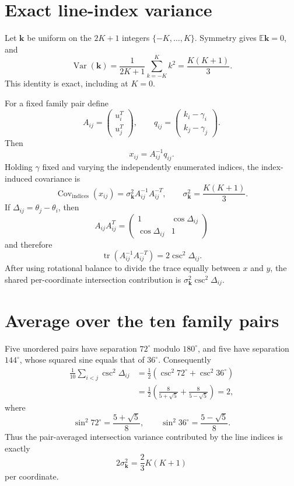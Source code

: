 \documentclass[11pt]{article}
\newcommand{\E}{\mathbb{E}}
\newcommand{\Var}{\operatorname{Var}}
\newcommand{\Cov}{\operatorname{Cov}}
\begin{document}
\section{Exact line-index variance}

Let \(\mathbf{k}\) be uniform on the \(2K+1\) integers
\(\{-K,\ldots,K\}\).  Symmetry gives \(\E\mathbf{k}=0\), and
\[
  \Var(\mathbf{k})
  =\frac{1}{2K+1}
    \sum_{k=-K}^{K}k^2
  =\frac{K(K+1)}{3}.
  \label{eq:index-variance}
\]
This identity is exact, including at \(K=0\).

For a fixed family pair define
\[
  A_{ij}=
  \begin{pmatrix}u_i^T\\u_j^T\end{pmatrix},
  \qquad
  q_{ij}=
  \begin{pmatrix}k_i-\gamma_i\\k_j-\gamma_j\end{pmatrix}.
\]
Then
\[
  x_{ij}=A_{ij}^{-1}q_{ij}.
\]
Holding \(\gamma\) fixed and varying the independently enumerated indices,
the index-induced covariance is
\[
  \Cov_{\mathrm{indices}}(x_{ij})
  =\sigma_{\mathbf{k}}^2 A_{ij}^{-1}A_{ij}^{-T},
  \qquad
  \sigma_{\mathbf{k}}^2=\frac{K(K+1)}{3}.
\]
If \(\Delta_{ij}=\theta_j-\theta_i\), then
\[
  A_{ij}A_{ij}^T
  =
  \begin{pmatrix}
    1&\cos\Delta_{ij}\\
    \cos\Delta_{ij}&1
  \end{pmatrix}
\]
and therefore
\[
  \operatorname{tr}
  \left(A_{ij}^{-1}A_{ij}^{-T}\right)
  =2\csc^2\Delta_{ij}.
\]
After using rotational balance to divide the trace equally between \(x\) and
\(y\), the shared per-coordinate intersection contribution is
\(\sigma_{\mathbf{k}}^2\csc^2\Delta_{ij}\).

\section{Average over the ten family pairs}

Five unordered pairs have separation \(72^\circ\) modulo \(180^\circ\), and
five have separation \(144^\circ\), whose squared sine equals that of
\(36^\circ\).  Consequently
\begin{align*}
  \frac1{10}\sum_{i<j}\csc^2\Delta_{ij}
  &=
  \frac12\left(\csc^2 72^\circ+\csc^2 36^\circ\right)\\
  &=
  \frac12\left(
    \frac{8}{5+\sqrt5}+\frac{8}{5-\sqrt5}
  \right)
  =2,
\end{align*}
where
\[
  \sin^2 72^\circ=\frac{5+\sqrt5}{8},
  \qquad
  \sin^2 36^\circ=\frac{5-\sqrt5}{8}.
\]
Thus the pair-averaged intersection variance contributed by the line indices
is exactly
\[
  2\sigma_{\mathbf{k}}^2
  =\frac{2}{3}K(K+1)
\]
per coordinate.
\end{document}
